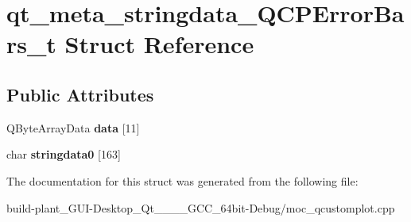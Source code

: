 \hypertarget{structqt__meta__stringdata__QCPErrorBars__t}{}\section{qt\+\_\+meta\+\_\+stringdata\+\_\+\+Q\+C\+P\+Error\+Bars\+\_\+t Struct Reference}
\label{structqt__meta__stringdata__QCPErrorBars__t}
\subsection*{Public Attributes}
\begin{DoxyCompactItemize}
\item 
\mbox{\label{structqt__meta__stringdata__QCPErrorBars__t_a806cc685f8b46afdca68d6d320f2450b}} 
Q\+Byte\+Array\+Data {\bfseries data} \mbox{[}11\mbox{]}
\item 
\mbox{\label{structqt__meta__stringdata__QCPErrorBars__t_a651dca586cf4ad7d2d0c36d8723c59b2}} 
char {\bfseries stringdata0} \mbox{[}163\mbox{]}
\end{DoxyCompactItemize}


The documentation for this struct was generated from the following file\+:\begin{DoxyCompactItemize}
\item 
build-\/plant\+\_\+\+G\+U\+I-\/\+Desktop\+\_\+\+Qt\+\_\+\_\+\_\+\_\+\+G\+C\+C\+\_\+64bit-\/\+Debug/moc\+\_\+qcustomplot.\+cpp\end{DoxyCompactItemize}
